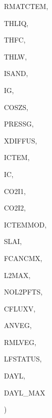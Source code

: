 {\begin{DoxyParamCaption}
\item[{real, dimension(ilg,ictem,ig)}]{R\+M\+A\+T\+C\+T\+E\+M, }
\item[{real, dimension(ilg,ig)}]{T\+H\+L\+I\+Q, }
\item[{real, dimension(ilg,ig)}]{T\+H\+F\+C, }
\item[{real, dimension(ilg,ig)}]{T\+H\+L\+W, }
\item[{integer, dimension(ilg,ig)}]{I\+S\+A\+N\+D, }
\item[{integer}]{I\+G, }
\item[{real, dimension(ilg)}]{C\+O\+S\+Z\+S, }
\item[{real, dimension(ilg)}]{P\+R\+E\+S\+S\+G, }
\item[{real, dimension(ilg)}]{X\+D\+I\+F\+F\+U\+S, }
\item[{integer}]{I\+C\+T\+E\+M, }
\item[{integer}]{I\+C, }
\item[{real, dimension(ilg,ictem)}]{C\+O2\+I1, }
\item[{real, dimension(ilg,ictem)}]{C\+O2\+I2, }
\item[{integer}]{I\+C\+T\+E\+M\+M\+O\+D, }
\item[{real, dimension(ilg,ictem)}]{S\+L\+A\+I, }
\item[{real, dimension(ilg,ictem)}]{F\+C\+A\+N\+C\+M\+X, }
\item[{integer}]{L2\+M\+A\+X, }
\item[{integer, dimension(ic)}]{N\+O\+L2\+P\+F\+T\+S, }
\item[{real, dimension(ilg)}]{C\+F\+L\+U\+X\+V, }
\item[{real, dimension(ilg,ictem)}]{A\+N\+V\+E\+G, }
\item[{real, dimension(ilg,ictem)}]{R\+M\+L\+V\+E\+G, }
\item[{integer, dimension(ilg,ictem)}]{L\+F\+S\+T\+A\+T\+U\+S, }
\item[{real, dimension(ilg)}]{D\+A\+Y\+L, }
\item[{real, dimension(ilg)}]{D\+A\+Y\+L\+\_\+\+M\+A\+X}
\end{DoxyParamCaption}
)}\label{TSOLVC_8f_a01fda37677d459d89fc416b29cb0aff3}

